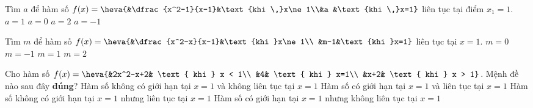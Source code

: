 \begin{ex}%
	Tìm $a$ để  hàm số $f(x)=\heva{&\dfrac{x^2-1}{x-1}&\text{khi \,}x\ne 1\\&a &\text{khi \,}x=1}$ liên tục tại điểm $x_1=1$.
	\choice 
		 {$a=1$}
		{$a=0$} 
		{\True $a=2$} 
		 {$a=-1$}
\end{ex}

\begin{ex}%
	Tìm $m$ để hàm  số $f(x)=\heva{&\dfrac{x^2-x}{x-1}&\text{khi }x\ne 1\\
	&m-1&\text{khi  }x=1}$ liên tục tại $x=1$.
	 \choice
		{$m=0$} 
		{$m=-1$} 
		{$m=1$} 
		{\True  $m=2$}
\end{ex}

\begin{ex}%
	Cho hàm số $f(x)=\heva{&2x^2-x+2& \text{ khi } x < 1\\ &4& \text{ khi } x=1\\ &x+2& \text{ khi } x  > 1}$. Mệnh đề nào sau đây \textbf{đúng}?
	\choice 
		{Hàm số không có giới hạn tại $x=1$ và không liên  tục tại $x=1$}
		{Hàm số có giới hạn tại  $x=1$ và liên tục tại $x=1$}
		 {Hàm số không có giới hạn tại $x=1$ nhưng liên tục tại $x=1$}
		{\True Hàm số có giới hạn tại $x=1$ nhưng không liên tục  tại $x=1$}
\end{ex}

